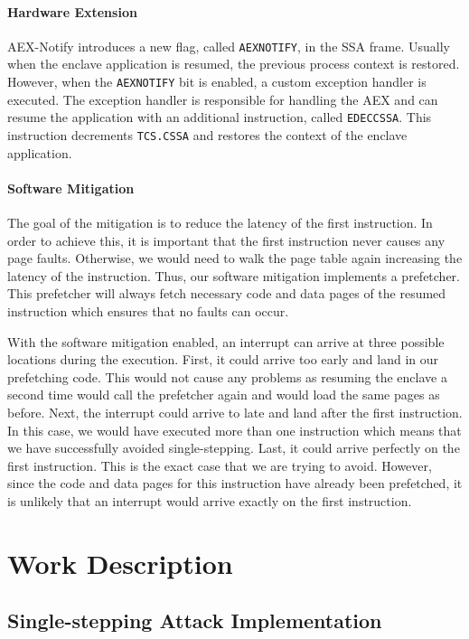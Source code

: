 \documentclass{llncs}
\begin{document}
\paragraph{Hardware Extension}
AEX-Notify introduces a new flag, called \texttt{AEXNOTIFY}, in the SSA frame.
Usually when the enclave application is resumed, the previous process context
is restored.
However, when the \texttt{AEXNOTIFY} bit is enabled, a custom exception handler
is executed.
The exception handler is responsible for handling the AEX and can resume the
application with an additional instruction, called \texttt{EDECCSSA}.
This instruction decrements \texttt{TCS.CSSA} and restores the context of the
enclave application.

\paragraph{Software Mitigation}
The goal of the mitigation is to reduce the latency of the first instruction.
In order to achieve this, it is important that the first instruction never
causes any page faults.
Otherwise, we would need to walk the page table again increasing the latency of
the instruction.
Thus, our software mitigation implements a prefetcher.
This prefetcher will always fetch necessary code and data pages of the resumed
instruction which ensures that no faults can occur.

With the software mitigation enabled, an interrupt can arrive at three possible
locations during the execution.
First, it could arrive too early and land in our prefetching code.
This would not cause any problems as resuming the enclave a second time would
call the prefetcher again and would load the same pages as before.
Next, the interrupt could arrive to late and land after the first instruction.
In this case, we would have executed more than one instruction which means
that we have successfully avoided single-stepping.
Last, it could arrive perfectly on the first instruction.
This is the exact case that we are trying to avoid.
However, since the code and data pages for this instruction have already been prefetched,
it is unlikely that an interrupt would arrive exactly on the first instruction.

\section{Work Description}

\subsection{Single-stepping Attack Implementation}
\end{document}
